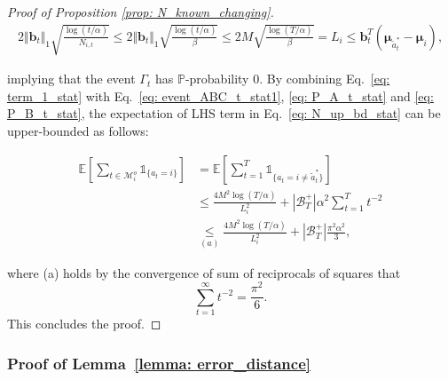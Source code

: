 \begin{proof}[Proof of Proposition \ref{prop: N_known_changing}]
\begin{equation}
\begin{aligned}
2 \Vert \boldsymbol{b}_t \Vert_1 \sqrt{\frac{ \log(t/\alpha)}{N_{i,t}}}
\leq
2 \Vert \boldsymbol{b}_t \Vert_1 \sqrt{\frac{ \log(t/\alpha)}{\beta}}
\leq
2 M \sqrt{\frac{ \log(T/\alpha)}{\beta}} = L_i 
\leq 
\boldsymbol{b}_t^T (\boldsymbol{\mu}_{\tilde{a}^{*}_{t}} - \boldsymbol{\mu}_{i}), 
\end{aligned}
\end{equation}

implying that the event $\Gamma_t$ has $\mathbb{P}$-probability 0.
By combining Eq.~\ref{eq: term_1_stat} with Eq.~\ref{eq: event_ABC_t_stat1}, \ref{eq: P_A_t_stat} and \ref{eq: P_B_t_stat}, the expectation of LHS term in Eq.~\ref{eq: N_up_bd_stat} can be upper-bounded as follows:

\begin{equation}
\begin{aligned}
\label{eq: upbd_term_1_stat}
\mathbb{E} \left[\sum_{t \in \mathcal{M}^{o}_i} \mathds{1}_{\{a_t = i \} } \right]
& = 
\mathbb{E} \left[ \sum_{t=1}^{T} \mathds{1}_{\{a_t = i \neq \tilde{a}^{*}_{t} \}} \right] \\
& \leq 
\frac{4 M^2 \log (T/\alpha)}{L_i^2}
+
|\mathcal{B}^{+}_{T}| \alpha^2 \sum_{t=1}^{T} t^{-2}  \\
& \underset{(a)}{\leq}
\frac{4 M^2 \log (T/\alpha)}{L_i^2}
+
|\mathcal{B}^{+}_{T}| \frac{\pi^2 \alpha^2}{3},
\end{aligned}
\end{equation}

where (a) holds by the convergence of sum of reciprocals of squares that 
\begin{equation}
\label{eq: riemann_zeta}
\sum_{t=1}^{\infty} t^{-2} = \frac{\pi^2}{6}.
\end{equation}
This concludes the proof.
\end{proof}

\subsubsection{Proof of Lemma~\ref{lemma: error_distance}}
\label{sec: proof_lemma_error_distance}

